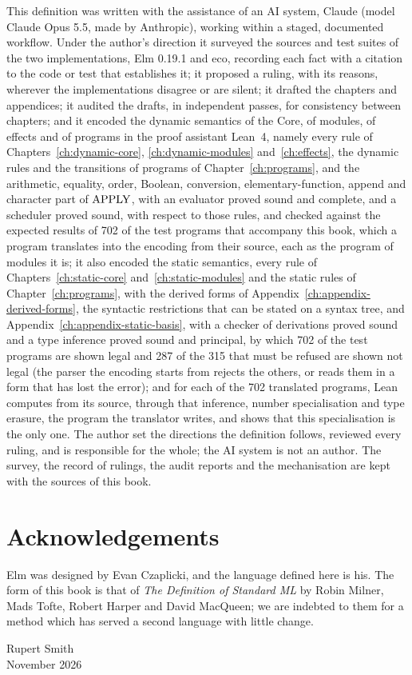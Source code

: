 This definition was written with the assistance of an AI system, Claude
(model Claude Opus 5.5, made by Anthropic), working within a staged,
documented workflow. Under the author's direction it surveyed the sources
and test suites of the two implementations, Elm 0.19.1 and eco, recording
each fact with a citation to the code or test that establishes it; it
proposed a ruling, with its reasons, wherever the implementations disagree
or are silent; it drafted the chapters and appendices; it audited the
drafts, in independent passes, for consistency between chapters; and it
encoded the dynamic semantics of the Core, of modules, of effects and of
programs in the proof assistant Lean~4, namely every rule of
Chapters~\ref{ch:dynamic-core}, \ref{ch:dynamic-modules} and~\ref{ch:effects},
the dynamic rules and the transitions of programs of
Chapter~\ref{ch:programs}, and the arithmetic, equality, order, Boolean,
conversion, elementary-function, append and character part of $\mathrm{APPLY}$,
with an evaluator proved sound and complete, and a scheduler proved sound,
with respect to those rules, and checked against the expected results of 702 of the test programs that
accompany this book, which a program translates into the encoding from their
source, each as the program of modules it is; it also encoded the static
semantics, every rule of Chapters~\ref{ch:static-core} and~\ref{ch:static-modules}
and the static rules of Chapter~\ref{ch:programs}, with the derived forms of
Appendix~\ref{ch:appendix-derived-forms}, the syntactic restrictions that can be
stated on a syntax tree, and Appendix~\ref{ch:appendix-static-basis}, with a checker
of derivations proved sound and a type inference proved sound and principal, by
which 702 of the test programs are shown legal and 287 of the 315 that must be
refused are shown not legal (the parser the encoding starts from rejects the
others, or reads them in a form that has lost the error); and for each of the
702 translated programs, Lean computes from its source, through that inference,
number specialisation and type erasure, the program the translator writes, and
shows that this specialisation is the only one. The author set the directions the
definition follows, reviewed every ruling, and is responsible for the
whole; the AI system is not an author. The survey, the record of rulings,
the audit reports and the mechanisation are kept with the sources of this
book.

\section*{Acknowledgements}

Elm was designed by Evan Czaplicki, and the language defined here is his.
The form of this book is that of \emph{The Definition of Standard ML} by
Robin Milner, Mads Tofte, Robert Harper and David MacQueen; we are indebted
to them for a method which has served a second language with little change.

\bigskip
\begin{flushright}
Rupert Smith\\[2ex]
November 2026
\end{flushright}
